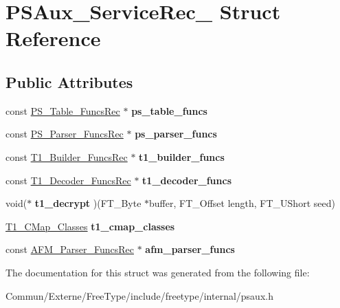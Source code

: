 \hypertarget{struct_p_s_aux___service_rec__}{}\section{P\+S\+Aux\+\_\+\+Service\+Rec\+\_\+ Struct Reference}
\label{struct_p_s_aux___service_rec__}
\subsection*{Public Attributes}
\begin{DoxyCompactItemize}
\item 
const \hyperlink{struct_p_s___table___funcs_rec__}{P\+S\+\_\+\+Table\+\_\+\+Funcs\+Rec} $\ast$ {\bfseries ps\+\_\+table\+\_\+funcs}\hypertarget{struct_p_s_aux___service_rec___ad328bf7394cad5b2838822aa109acc42}{}\label{struct_p_s_aux___service_rec___ad328bf7394cad5b2838822aa109acc42}

\item 
const \hyperlink{struct_p_s___parser___funcs_rec__}{P\+S\+\_\+\+Parser\+\_\+\+Funcs\+Rec} $\ast$ {\bfseries ps\+\_\+parser\+\_\+funcs}\hypertarget{struct_p_s_aux___service_rec___ac673695e814332b38fd33c7f0287a4b7}{}\label{struct_p_s_aux___service_rec___ac673695e814332b38fd33c7f0287a4b7}

\item 
const \hyperlink{struct_t1___builder___funcs_rec__}{T1\+\_\+\+Builder\+\_\+\+Funcs\+Rec} $\ast$ {\bfseries t1\+\_\+builder\+\_\+funcs}\hypertarget{struct_p_s_aux___service_rec___a3fe7449b123d0fb6f7ba92462c4e94c1}{}\label{struct_p_s_aux___service_rec___a3fe7449b123d0fb6f7ba92462c4e94c1}

\item 
const \hyperlink{struct_t1___decoder___funcs_rec__}{T1\+\_\+\+Decoder\+\_\+\+Funcs\+Rec} $\ast$ {\bfseries t1\+\_\+decoder\+\_\+funcs}\hypertarget{struct_p_s_aux___service_rec___a5cfe03f55fa4c342a094fd31355835b2}{}\label{struct_p_s_aux___service_rec___a5cfe03f55fa4c342a094fd31355835b2}

\item 
void($\ast$ {\bfseries t1\+\_\+decrypt} )(F\+T\+\_\+\+Byte $\ast$buffer, F\+T\+\_\+\+Offset length, F\+T\+\_\+\+U\+Short seed)\hypertarget{struct_p_s_aux___service_rec___a8f56c369db4df9268b255dba29aadc9f}{}\label{struct_p_s_aux___service_rec___a8f56c369db4df9268b255dba29aadc9f}

\item 
\hyperlink{struct_t1___c_map___classes_rec__}{T1\+\_\+\+C\+Map\+\_\+\+Classes} {\bfseries t1\+\_\+cmap\+\_\+classes}\hypertarget{struct_p_s_aux___service_rec___a4ac30b929dcc6127200baea07b5b406a}{}\label{struct_p_s_aux___service_rec___a4ac30b929dcc6127200baea07b5b406a}

\item 
const \hyperlink{struct_a_f_m___parser___funcs_rec__}{A\+F\+M\+\_\+\+Parser\+\_\+\+Funcs\+Rec} $\ast$ {\bfseries afm\+\_\+parser\+\_\+funcs}\hypertarget{struct_p_s_aux___service_rec___a9ddf18cc18487266a3e1dd7721fd12fb}{}\label{struct_p_s_aux___service_rec___a9ddf18cc18487266a3e1dd7721fd12fb}

\end{DoxyCompactItemize}


The documentation for this struct was generated from the following file\+:\begin{DoxyCompactItemize}
\item 
Commun/\+Externe/\+Free\+Type/include/freetype/internal/psaux.\+h\end{DoxyCompactItemize}
